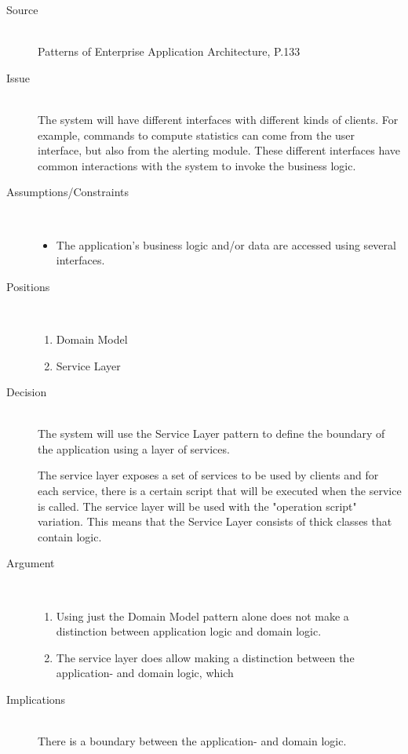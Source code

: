 \begin{description}
\item [Source]~\\
Patterns of Enterprise Application Architecture, P.133 \cite{Fowler:2002:PEA:579257}

\item [Issue]~\\
The system will have different interfaces with different kinds of clients. For example, commands to compute statistics can come from the user interface, but also from the alerting module. These different interfaces have common interactions with the system to invoke the business logic.

\item [Assumptions/Constraints]~
\begin{itemize}
\item The application's business logic and/or data are accessed using several interfaces.
\end{itemize}

\item [Positions]~
\begin{enumerate}
\item Domain Model %
\item Service Layer
\end{enumerate}


\item [Decision] ~\\
The system will use the Service Layer pattern to define the boundary of the application using a layer of services.

The service layer exposes a set of services to be used by clients and for each service, there is a certain script that will be executed when the service is called. The service layer will be used with the "operation script" variation. This means that the Service Layer consists of thick classes that contain logic.
\item [Argument]~
\begin{enumerate}
\item Using just the Domain Model pattern alone does not make a distinction between application logic and domain logic.

\item The service layer does allow making a distinction between the application- and domain logic, which 
\end{enumerate}

\item [Implications]~\\
There is a boundary between the application- and domain logic. 


\end{description}
